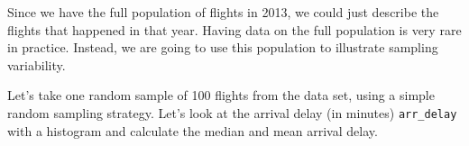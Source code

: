 \documentclass[]{book}
\newenvironment{Shaded}{\begin{snugshade}}{\end{snugshade}}
\newcommand{\CommentTok}[1]{\textcolor[rgb]{0.56,0.35,0.01}{\textit{#1}}}
\newcommand{\DataTypeTok}[1]{\textcolor[rgb]{0.13,0.29,0.53}{#1}}
\newcommand{\DecValTok}[1]{\textcolor[rgb]{0.00,0.00,0.81}{#1}}
\newcommand{\KeywordTok}[1]{\textcolor[rgb]{0.13,0.29,0.53}{\textbf{#1}}}
\newcommand{\NormalTok}[1]{#1}
\newcommand{\OperatorTok}[1]{\textcolor[rgb]{0.81,0.36,0.00}{\textbf{#1}}}
\newcommand{\StringTok}[1]{\textcolor[rgb]{0.31,0.60,0.02}{#1}}
\begin{document}
\begin{Shaded}
\end{Shaded}

Since we have the full population of flights in 2013, we could just describe the flights that happened in that year. Having data on the full population is very rare in practice. Instead, we are going to use this population to illustrate sampling variability.

Let's take one random sample of 100 flights from the data set, using a simple random sampling strategy. Let's look at the arrival delay (in minutes) \texttt{arr\_delay} with a histogram and calculate the median and mean arrival delay.

\begin{Shaded}
\end{Shaded}
\end{document}
